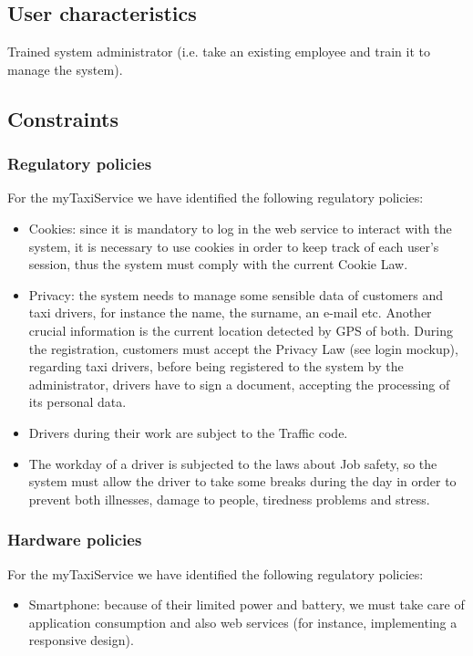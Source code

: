 \documentclass[a4paper,12pt]{article}%
\begin{document}
\subsection{User characteristics}
Trained system administrator (i.e. take an existing employee and train it to manage the system).
\subsection{Constraints}
\subsubsection{Regulatory policies}
For the myTaxiService we have identified the following regulatory policies:
\begin{itemize}
\item Cookies: since it is mandatory to log in the web service to interact with the system, it is necessary to use cookies in order to keep track of each user's session, thus the system must comply with the current Cookie Law.
\item Privacy: the system needs to manage some sensible data of customers and taxi drivers, for instance the name, the surname, an e-mail etc. Another crucial information is the current location detected by GPS of both. During the registration, customers must accept the Privacy Law (see login mockup), regarding taxi drivers, before being registered to the system by the administrator, drivers have to sign a document, accepting the processing of its personal data.
\item Drivers during their work are subject to the Traffic code.
\item The workday of a driver is subjected to the laws about Job safety, so the system must allow the driver to take some breaks during the day in order to prevent both illnesses, damage to people, tiredness problems and stress.
\end{itemize}
\subsubsection{Hardware policies}
For the myTaxiService we have identified the following regulatory policies:
\begin{itemize}
\item Smartphone: because of their limited power and battery, we must take care of application consumption and also web services (for instance, implementing a responsive design).
\end{itemize}
\end{document}
